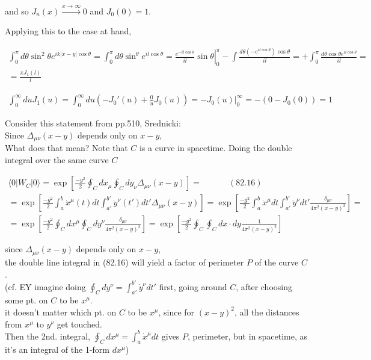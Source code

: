 \documentclass[twoside]{amsart}
\begin{document}
and so $J_n(x) \xrightarrow{ x\to \infty} 0$ and $J_0(0)=1$.  





Applying this to the case at hand,

\[
\begin{gathered}
  \int_0^{\pi} d\theta \sin^2{ \theta } e^{ ik |x-y| \cos{\theta } } = \int_0^{\pi} d\theta \sin^{\theta} e^{ i l \cos{\theta } } =  \left. \frac{ e^{ - i l \cos{\theta  }} }{ il } \sin{\theta} \right|_0^{\pi} - \int \frac{ d\theta ( - e^{ il \cos{\theta} }  )\cos{\theta } }{ il } = + \int_0^{\pi}  \frac{ d \theta \cos{\theta } e^{ il \cos{\theta } } }{ il } = \\
  = \frac{ \pi J_1(l) }{ l }
\end{gathered}
\]


\[
\begin{gathered}
\int_0^{\infty} du J_1(u) = \int_0^{\infty} du ( -J_0'(u) + \frac{0}{u} J_0(u) ) = - \left. J_0(u) \right|_0^{\infty} = - ( 0 - J_0(0) ) = 1
\end{gathered}
\]

Consider this statement from pp.510, Srednicki: \\

Since $\Delta_{\mu \nu}(x-y)$ depends only on $x-y$, \\

What does that mean?  Note that $C$ is a curve in spacetime.  Doing the double integral over the same curve $C$

\[
\begin{gathered}
  \langle 0 | W_C | 0 \rangle = \exp{ \left[ \frac{-g^2}{2} \oint_C dx_{\mu} \oint_C dy_{\nu} \Delta_{\mu \nu}(x-y) \right] } = \quad \quad \quad \, (82.16) \\ 
  = \exp{ \left[ \frac{-g^2}{2} \int_a^b \dot{x}^{\mu}(t) dt \int_{a'}^{b'} \dot{y}^{\nu}(t') dt' \Delta_{\mu \nu}(x-y) \right] } = \exp{ \left[ \frac{-g^2}{2} \int_a^b \dot{x}^{\mu} dt \int_{a'}^{b'} \dot{y}^{\nu} dt' \frac{ \delta_{\mu  \nu } }{ 4\pi^2 ( x-y)^2 } \right] }  = \\
   = \exp{ \left[ \frac{-g^2}{2} \oint_C dx^{\mu} \oint_C dy^{\nu} \frac{ \delta_{\mu \nu } }{ 4\pi^2 (x-y)^2 }  \right] } = \exp{ \left[ \frac{-g^2}{2} \oint_C \oint_C dx \cdot dy \frac{1}{ 4\pi^2 ( x- y)^2 } \right] }
\end{gathered}
\]

since $\Delta_{\mu \nu}(x-y)$ depends only on $x-y$, \\
\quad the double line integral in (82.16) will yield a factor of perimeter $P$ of the curve $C$.  \\
(cf. EY imagine doing $\oint_C dy^{\nu} = \int_{a'}^{b'} \dot{y}^{\nu} dt'$ first, going around $C$, after choosing some pt. on $C$ to be $x^{\mu}$.  \\
it doesn't matter which pt. on $C$ to be $x^{\mu}$, since for $(x-y)^2$, all the distances from $x^{\mu}$ to $y^{\nu}$ get touched.  \\
Then the 2nd. integral, $\oint_C dx^{\mu} = \int_a^b \dot{x}^{\mu} dt$ gives $P$, perimeter, but in spacetime, as it's an integral of the 1-form $dx^{\mu}$) \\
\end{document}
